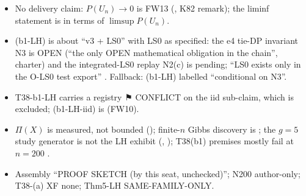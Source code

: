 \begin{notproved}
\begin{itemize}
\item No delivery claim: $P(U_n)\to0$ is FW13 (, K82 remark); the liminf statement is in terms of $\limsup P(U_n)$.
\item (b1-LH) is about ``v3 + LS0'' with LS0 as specified: the e4 tie-DP invariant N3 is OPEN (``the only OPEN mathematical obligation in the chain'', charter) and the integrated-LS0 replay N2(c) is pending; ``LS0 exists only in the O-LS0 test export'' . Fallback: (b1-LH) labelled ``conditional on N3''.
\item T38-b1-LH carries a registry ⚑ CONFLICT on the iid sub-claim, which is excluded; (b1-LH-iid) is  (FW10).
\item $\Pi(X)$ is measured, not bounded (); finite-$n$ Gibbs discovery is ; the $g=5$ study generator is not the LH exhibit (, ); T38(b1) premises mostly fail at $n=200$ .
\item Assembly ``PROOF SKETCH (by this seat, unchecked)''; N200 author-only; T38-(a) XF none; Thm5-LH SAME-FAMILY-ONLY.
\end{itemize}
\end{notproved}

